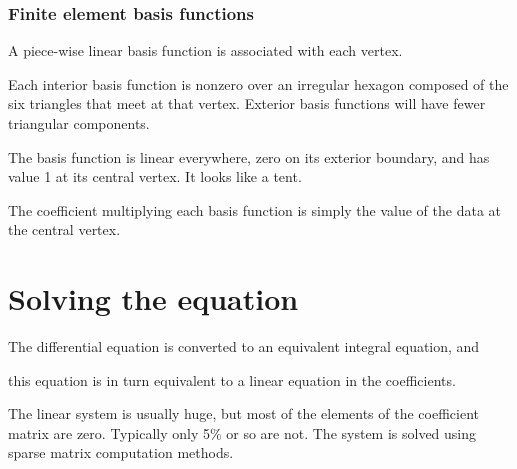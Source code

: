 \documentclass[11pt]{beamer}
\begin{document}

\begin{frame}


\frametitle{Finite element basis functions}

\bi
  \item A piece-wise linear basis function is associated
  with each vertex.
  \item Each interior basis function is nonzero over an irregular
  hexagon composed of the six triangles that meet at that
  vertex.  Exterior basis functions will have fewer triangular
  components.
  \item The basis function is linear everywhere, zero on its
  exterior boundary, and has value 1 at its central vertex.  It looks
  like a tent.
  \item The coefficient multiplying each basis function is
  simply the value of the data at the central vertex.
\ei

\end{frame}



\section{Solving the equation}

\begin{frame}

\bi
  \item The differential equation is converted to an
  equivalent integral equation, and
  \item this equation is in turn
  equivalent to a linear equation in the coefficients.
  \item The linear system is usually huge, but most
  of the elements of the coefficient matrix are zero.
  Typically only 5\% or so are not.  The system is
  solved using sparse matrix computation methods.
\ei

\end{frame}


\end{document}
